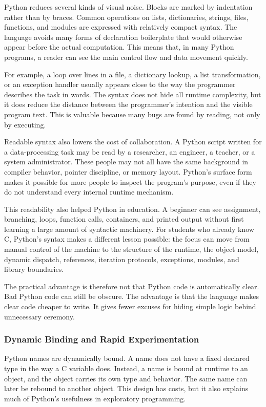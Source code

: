 Python reduces several kinds of visual noise. Blocks are marked by indentation rather than by braces. Common operations on lists, dictionaries, strings, files, functions, and modules are expressed with relatively compact syntax. The language avoids many forms of declaration boilerplate that would otherwise appear before the actual computation. This means that, in many Python programs, a reader can see the main control flow and data movement quickly.

For example, a loop over lines in a file, a dictionary lookup, a list transformation, or an exception handler usually appears close to the way the programmer describes the task in words. The syntax does not hide all runtime complexity, but it does reduce the distance between the programmer's intention and the visible program text. This is valuable because many bugs are found by reading, not only by executing.

Readable syntax also lowers the cost of collaboration. A Python script written for a data-processing task may be read by a researcher, an engineer, a teacher, or a system administrator. These people may not all have the same background in compiler behavior, pointer discipline, or memory layout. Python's surface form makes it possible for more people to inspect the program's purpose, even if they do not understand every internal runtime mechanism.

This readability also helped Python in education. A beginner can see assignment, branching, loops, function calls, containers, and printed output without first learning a large amount of syntactic machinery. For students who already know C, Python's syntax makes a different lesson possible: the focus can move from manual control of the machine to the structure of the runtime, the object model, dynamic dispatch, references, iteration protocols, exceptions, modules, and library boundaries.

The practical advantage is therefore not that Python code is automatically clear. Bad Python code can still be obscure. The advantage is that the language makes clear code cheaper to write. It gives fewer excuses for hiding simple logic behind unnecessary ceremony.

\subsubsection{Dynamic Binding and Rapid Experimentation}

Python names are dynamically bound. A name does not have a fixed declared type in the way a C variable does. Instead, a name is bound at runtime to an object, and the object carries its own type and behavior. The same name can later be rebound to another object. This design has costs, but it also explains much of Python's usefulness in exploratory programming.


